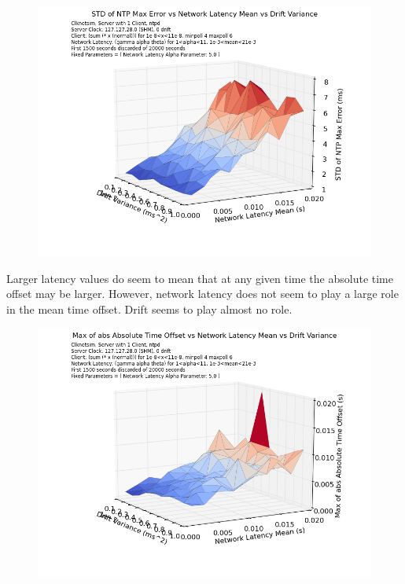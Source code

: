 \begin{figure}[h]
  \caption{}
  \label{fig:stddev-mean-drift-var}
  \includegraphics[width=1\linewidth]{stddev_max_err-mean_latency-drift_variance}
\end{figure}

Larger latency values do seem to mean that at any given time the
absolute time offset may be larger. However, network latency does not
seem to play a large role in the mean time offset. Drift seems to play
almost no role.


\begin{figure}[h]
  \includegraphics[width=1\linewidth]{max_abs_time-latency_mean-drift_var.png}
\end{figure}

